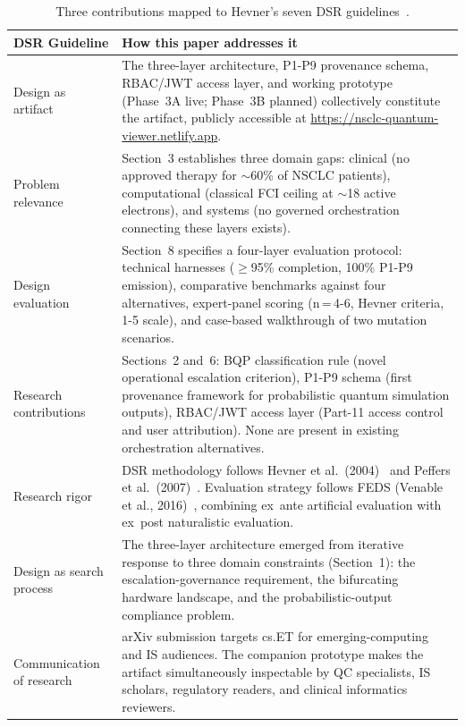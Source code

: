 \documentclass[11pt,letterpaper]{article}
\begin{document}
\begin{table}[H]
\centering
\caption{Three contributions mapped to Hevner's seven DSR guidelines~\cite{hevner2004}.}
\label{tab:hevner}
\small
\begin{tabularx}{\textwidth}{@{}lX@{}}
\toprule
\textbf{DSR Guideline} & \textbf{How this paper addresses it} \\
\midrule
Design as artifact &
The three-layer architecture, P1-P9 provenance schema, RBAC/JWT access layer, and working
prototype (Phase~3A live; Phase~3B planned) collectively constitute the artifact, publicly
accessible at \url{https://nsclc-quantum-viewer.netlify.app}. \\[4pt]
Problem relevance &
Section~3 establishes three domain gaps: clinical (no approved therapy for $\sim$60\% of
NSCLC patients), computational (classical FCI ceiling at $\sim$18 active electrons), and
systems (no governed orchestration connecting these layers exists). \\[4pt]
Design evaluation &
Section~8 specifies a four-layer evaluation protocol: technical harnesses ($\geq$95\%
completion, 100\% P1-P9 emission), comparative benchmarks against four alternatives,
expert-panel scoring (n\,=\,4-6, Hevner criteria, 1-5 scale), and case-based walkthrough
of two mutation scenarios. \\[4pt]
Research contributions &
Sections~2 and~6: BQP classification rule (novel operational escalation criterion), P1-P9
schema (first provenance framework for probabilistic quantum simulation outputs), RBAC/JWT
access layer (Part-11 access control and user attribution).  None are present in existing
orchestration alternatives. \\[4pt]
Research rigor &
DSR methodology follows Hevner et al.\ (2004)~\cite{hevner2004} and Peffers et al.\
(2007)~\cite{peffers2007}.  Evaluation strategy follows FEDS (Venable et al.,
2016)~\cite{venable2016}, combining ex~ante artificial evaluation with ex~post naturalistic
evaluation. \\[4pt]
Design as search process &
The three-layer architecture emerged from iterative response to three domain constraints
(Section~1): the escalation-governance requirement, the bifurcating hardware landscape, and
the probabilistic-output compliance problem. \\[4pt]
Communication of research &
arXiv submission targets cs.ET for emerging-computing and IS audiences.  The companion
prototype makes the artifact simultaneously inspectable by QC specialists, IS scholars,
regulatory readers, and clinical informatics reviewers. \\
\bottomrule
\end{tabularx}
\end{table}
\end{document}
